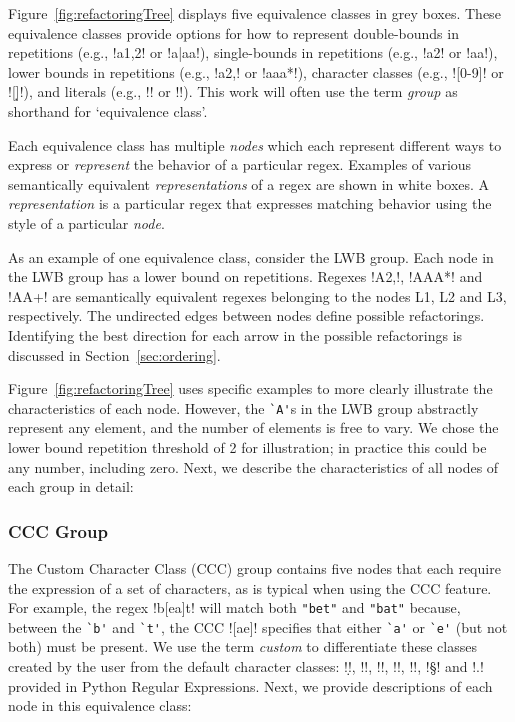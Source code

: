 Figure~\ref{fig:refactoringTree} displays five equivalence classes in grey boxes.  These equivalence classes provide options for how to represent double-bounds in repetitions (e.g., \cverb!a{1,2}! or \cverb!a|aa!), single-bounds in repetitions (e.g., \cverb!a{2}! or \cverb!aa!), lower bounds in repetitions (e.g., \cverb!a{2,}! or \cverb!aaa*!), character classes (e.g., \cverb![0-9]! or \cverb![\d]!), and literals (e.g., \cverb!\a! or \cverb!!).  This work will often use the term \emph{group} as shorthand for `equivalence class'.

Each equivalence class has multiple \emph{nodes} which each represent different ways to express or \emph{represent} the behavior of a particular regex.  Examples of various semantically equivalent \emph{representations} of a regex are shown in white boxes. A \emph{representation} is a particular regex that expresses matching behavior using the style of a particular \emph{node}.

As an example of one equivalence class, consider the LWB group.  Each node in the LWB group has a lower bound on repetitions. Regexes \cverb!A{2,}!, \cverb!AAA*! and \cverb!AA+! are semantically equivalent regexes belonging to the nodes L1, L2 and L3, respectively.
The undirected edges between nodes define possible refactorings.
Identifying the best direction for each arrow in the possible refactorings is discussed in Section~\ref{sec:ordering}.

Figure~\ref{fig:refactoringTree} uses specific examples to more clearly illustrate the characteristics of each node.  However, the \verb!`A'!s in the LWB group abstractly represent any element, and the number of elements is free to vary. We chose the lower bound repetition threshold of 2 for illustration; in practice this could be any number, including zero.
Next, we describe the characteristics of all nodes of each group in detail:

\subsubsection{CCC Group}
The Custom Character Class (CCC) group contains five nodes that each require the expression of a set of characters, as is typical when using the CCC feature.  For example, the regex \cverb!b[ea]t! will match both \verb!"bet"! and \verb!"bat"! because, between the \verb!`b'! and \verb!`t'!, the CCC \cverb![ae]! specifies that either \verb!`a'! or \verb!`e'! (but not both) must be present.
We use the term \emph{custom} to differentiate these classes created by the user from the default character classes: \cverb!\d!, \cverb!\D!, \cverb!\w!, \cverb!\W!, \cverb!\s!, \cverb!\S! and \cverb!.! provided in Python Regular Expressions.
Next, we provide descriptions of each node in this equivalence class:

